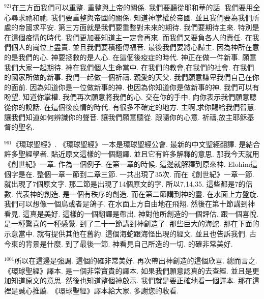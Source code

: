\documentclass{book}
\begin{document}
$^{921}$在三方面我們可以重整.
重整與上帝的關係.
我們要聽從耶和華的話.
我們要用全心尋求祂和祂.
我們要重整與帝國的關係.
知道神掌權於帝國.
並且我們要為我們所處的帝國求平安.
第三方面就是我們要重整對未來的期待.
我們要期待主來.
特別是在這個疫情的時代.
我們更加要知道主一定會再來.
而我們又要負各人的責任.
在我們個人的崗位上盡責.
並且我們要積極傳福音.
最後我們要將心歸主.
因為神所在意的是我們的心.
神要拯救的是人心.
在這個後疫症的時代.
神正在做一件新事.
願意我們大家一起期待.
神在我們個人生命當中.
在我們的教會,在我們的社會.
在我們的國家所做的新事.
我們一起做一個祈禱.
親愛的天父.
我們願意謙卑我們自己在你的面前.
因為知道你是一位做新事的神.
也因為你知道你是做新事的神.
我們可以有盼望.
知道你掌權.
我們再次願意將我們的心.
交在你的手中.
向你表示我們願意聽從你的說話.
在這個後疫情的時代.
有很多不確定的地方.
主啊,求你賜給我們智慧.
讓我們知道如何辨識你的聲音.
讓我們願意聽從.
跟隨你的心意.
祈禱,放主耶穌基督的聖名.

$^{961}$《環球聖經》.
《環球聖經》一本是環球聖經公會.
最新的中文聖經翻譯.
是結合許多聖經學者.
貼近原文這樣的一個翻譯.
並且它有許多解釋的意思.
那我今天就用《創世紀》一章.
作為一個例子.
在第一章的時候.
這邊就解釋到原來神.
Elohim這個字是在.
整個一章一節到二章三節.
一共出現了35次.
而在《創世紀》一章一節.
就出現了7個原文字.
那二節是出現了14個原文的字.
所以7,14,35.
這些都是7的倍數.
代表神的創造.
是一個有秩序的創造.
而在第二節講到神的靈.
在水面上方盤旋.
我們可以想像一個鳥或者是鴿子.
在水面上方自由地在飛翔.
然後在第十節講到神看見.
這真是美好.
這樣的一個翻譯是帶出.
神對他所創造的一個評估.
跟一個喜悅.
是一種驚喜的一種感覺.
到了二十一節講到神創造了.
那些巨大的海蛇.
那在下面的示意當中.
就有提供其他在舊約.
這個海蛇跟海怪出現的經文.
並且也告訴我們.
古今東的背景是什麼.
到了最後一節.
神看見自己所造的一切.
的確非常美好.

$^{1001}$所以在這邊是強調.
這個的確非常美好.
再次帶出神創造的這個欣喜.
總而言之.
《環球聖經》譯本.
是一個非常寶貴的譯本.
如果我們願意認真的去查經.
並且是更加知道原文的意思.
然後也知道整個神啟示.
我們就是要正確地看一個譯本.
那在這裡是誠心推薦.
《環球聖經》譯本給大家.
多謝您的收看.
\newpage
\end{document}
